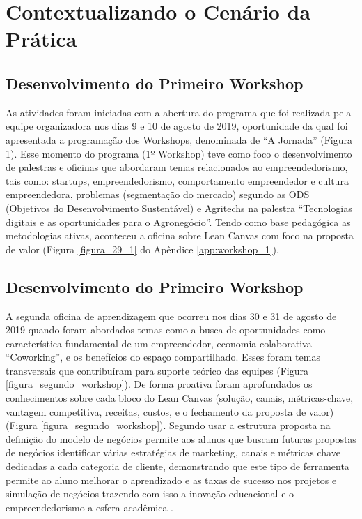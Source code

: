 \section{Contextualizando o Cenário da Prática}





\subsection{Desenvolvimento do Primeiro Workshop}

As atividades foram iniciadas com a abertura do programa que foi realizada pela equipe organizadora nos dias 9 e 10 de agosto de 2019, oportunidade da qual foi apresentada a programação dos Workshops, denominada de “A Jornada” (Figura 1). Esse momento do programa (1º Workshop) teve como foco o desenvolvimento de palestras e oficinas que abordaram temas relacionados ao empreendedorismo, tais como: startups, empreendedorismo, comportamento empreendedor e cultura empreendedora, problemas (segmentação do mercado) segundo as ODS (Objetivos do Desenvolvimento Sustentável) e Agritechs na palestra “Tecnologias digitais e as oportunidades para o Agronegócio”. Tendo como base pedagógica as metodologias ativas, aconteceu a oficina sobre Lean Canvas com foco na proposta de valor (Figura \ref{figura_29_1} do Apêndice 
\ref{app:workshop_1}).


\subsection{Desenvolvimento do Primeiro Workshop}

A segunda oficina de aprendizagem que ocorreu nos dias 30 e 31 de agosto de 2019 quando foram abordados temas como a busca de oportunidades como característica fundamental de um empreendedor, economia colaborativa “Coworking”, e os benefícios do espaço compartilhado. Esses foram temas transversais que contribuíram para suporte teórico das equipes (Figura \ref{figura_segundo_workshop}). De forma proativa foram aprofundados os conhecimentos sobre cada bloco do Lean Canvas (solução, canais, métricas-chave, vantagem competitiva, receitas, custos, e o fechamento da proposta de valor) (Figura \ref{figura_segundo_workshop}). Segundo  usar a estrutura proposta na definição do modelo de negócios permite aos alunos que buscam futuras propostas de negócios identificar várias estratégias de marketing, canais e métricas chave dedicadas a cada categoria de cliente, demonstrando que este tipo de ferramenta permite ao aluno melhorar o aprendizado e as taxas de sucesso nos projetos e simulação de negócios trazendo com isso a inovação educacional e o empreendedorismo a esfera acadêmica \cite{kukreti_entrepreneurship_2019}.


